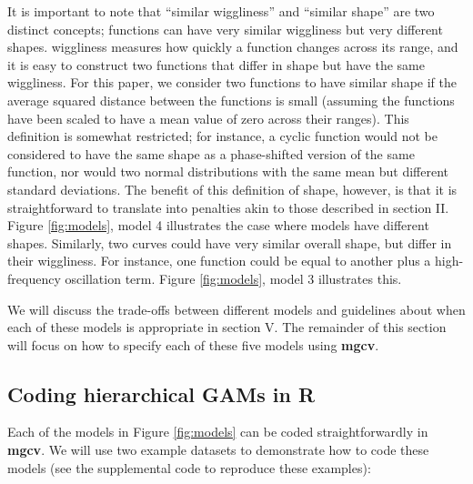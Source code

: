 \documentclass[12pt]{article}
\begin{document}
It is important to note that ``similar wiggliness'' and ``similar
shape'' are two distinct concepts; functions can have very similar
wiggliness but very different shapes. wiggliness measures how quickly a
function changes across its range, and it is easy to construct two
functions that differ in shape but have the same wiggliness. For this
paper, we consider two functions to have similar shape if the average
squared distance between the functions is small (assuming the functions
have been scaled to have a mean value of zero across their ranges). This
definition is somewhat restricted; for instance, a cyclic function would
not be considered to have the same shape as a phase-shifted version of
the same function, nor would two normal distributions with the same mean
but different standard deviations. The benefit of this definition of
shape, however, is that it is straightforward to translate into
penalties akin to those described in section II. Figure
\ref{fig:models}, model 4 illustrates the case where models have
different shapes. Similarly, two curves could have very similar overall
shape, but differ in their wiggliness. For instance, one function could
be equal to another plus a high-frequency oscillation term. Figure
\ref{fig:models}, model 3 illustrates this.

We will discuss the trade-offs between different models and guidelines
about when each of these models is appropriate in section V. The
remainder of this section will focus on how to specify each of these
five models using \textbf{mgcv}.

\subsection{Coding hierarchical GAMs in
R}\label{coding-hierarchical-gams-in-r}

Each of the models in Figure \ref{fig:models} can be coded
straightforwardly in \textbf{mgcv}. We will use two example datasets to
demonstrate how to code these models (see the supplemental code to
reproduce these examples):
\end{document}
